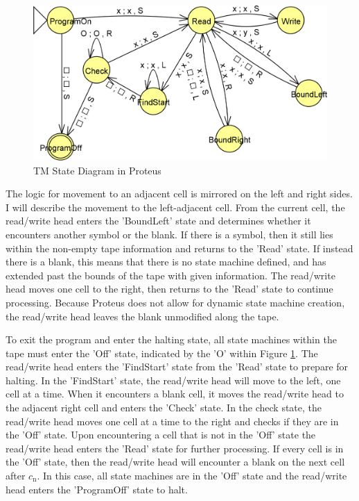 \begin{figure}[h!]
    \centering
    \includegraphics[width=16cm]{images/ProteusTM.png}
       \caption{TM State Diagram in Proteus}
           \label{fig:ProteusStateTM}
\end{figure}

The logic for movement to an adjacent cell is mirrored on the left and right sides.
I will describe the movement to the left-adjacent cell.
From the current cell, the read/write head enters the 'BoundLeft' state and determines whether it encounters another symbol or the blank.
If there is a symbol, then it still lies within the non-empty tape information and returns to the 'Read' state.
If instead there is a blank, this means that there is no state machine defined, and has extended past the bounds of the tape with given information.
The read/write head moves one cell to the right, then returns to the 'Read' state to continue processing.
Because Proteus does not allow for dynamic state machine creation, the read/write head leaves the blank unmodified along the tape.

To exit the program and enter the halting state, all state machines within the tape must enter the 'Off' state, indicated by the 'O' within Figure \ref{fig:ProteusStateTM}.
The read/write head enters the 'FindStart' state from the 'Read' state to prepare for halting.
In the 'FindStart' state, the read/write head will move to the left, one cell at a time.
When it encounters a blank cell, it moves the read/write head to the adjacent right cell and enters the 'Check' state.
In the check state, the read/write head moves one cell at a time to the right and checks if they are in the 'Off' state.
Upon encountering a cell that is not in the 'Off' state the read/write head enters the 'Read' state for further processing.
If every cell is in the 'Off' state, then the read/write head will encounter a blank on the next cell after $c_{\text{n}}$.
In this case, all state machines are in the 'Off' state and the read/write head enters the 'ProgramOff' state to halt.

